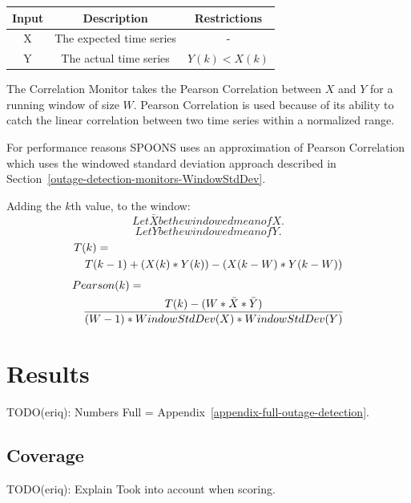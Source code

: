 \documentclass[12pt]{ucthesis}
\begin{document}
\begin{table}[H]
   \begin{center}
      \begin{tabular}{|c|c|c|}
         \hline
            Input & Description & Restrictions \\
         \hline
            X & The expected time series & - \\
         \hline
            Y & The actual time series & $ Y(k) < X(k) $\\
         \hline
      \end{tabular}
   \end{center}
\end{table}

The Correlation Monitor takes the Pearson Correlation between $X$ and $Y$ for a running window of size $W$.
Pearson Correlation is used because of its ability to catch the linear correlation between two time series within
a normalized range.

For performance reasons SPOONS uses an approximation of Pearson Correlation which uses the windowed standard deviation approach
described in Section~\ref{outage-detection-monitors-WindowStdDev}.

Adding the $k$th value, to the window:
$$
   Let \bar{X} be the windowed mean of X.
$$
$$
   Let \bar{Y} be the windowed mean of Y.
$$
\begin{eqnarray*}
   \lefteqn{T(k) = }\\
   && T(k - 1) + (X(k) * Y(k)) - (X(k - W) * Y(k -W))
\end{eqnarray*}
\begin{eqnarray*}
   \lefteqn{Pearson(k) = }\\
   && \frac{T(k) - (W * \bar{X} * \bar{Y})}{(W - 1) * WindowStdDev(X) * WindowStdDev(Y)}
\end{eqnarray*}

\section{Results}
\label{outage-detection-results}
TODO(eriq): Numbers
Full = Appendix~\ref{appendix-full-outage-detection}.



\subsection{Coverage}
\label{outage-detection-results-coverage}
TODO(eriq): Explain
Took into account when scoring.
\end{document}
